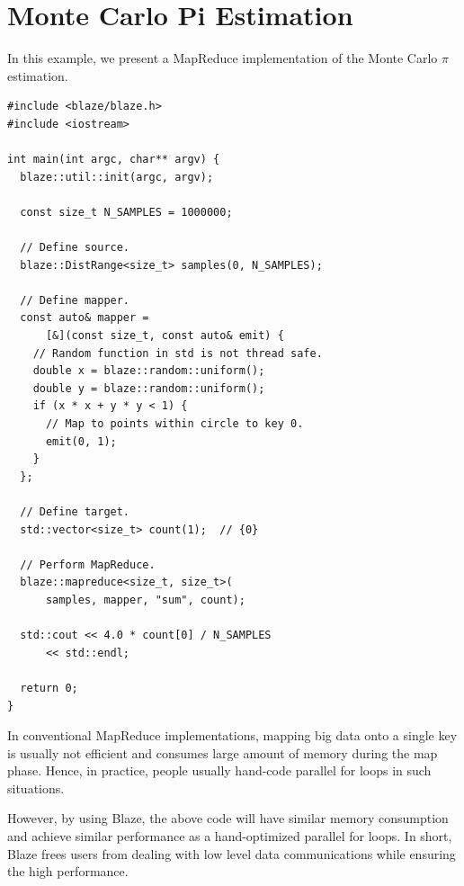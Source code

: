 \documentclass{sigkddExp}
\begin{document}
\section{Monte Carlo Pi Estimation}

In this example, we present a MapReduce implementation of the Monte Carlo $\pi$ estimation.

\begin{lstlisting}
#include <blaze/blaze.h>
#include <iostream>

int main(int argc, char** argv) {
  blaze::util::init(argc, argv);
  
  const size_t N_SAMPLES = 1000000;

  // Define source.
  blaze::DistRange<size_t> samples(0, N_SAMPLES);

  // Define mapper.
  const auto& mapper = 
      [&](const size_t, const auto& emit) {
    // Random function in std is not thread safe.
    double x = blaze::random::uniform();
    double y = blaze::random::uniform();
    if (x * x + y * y < 1) {
      // Map to points within circle to key 0.
      emit(0, 1);
    }
  };

  // Define target.
  std::vector<size_t> count(1);  // {0}

  // Perform MapReduce.
  blaze::mapreduce<size_t, size_t>(
      samples, mapper, "sum", count);

  std::cout << 4.0 * count[0] / N_SAMPLES
      << std::endl;
  
  return 0;
}
\end{lstlisting}

In conventional MapReduce implementations, mapping big data onto a single key is usually not efficient and consumes large amount of memory during the map phase.
Hence, in practice, people usually hand-code parallel for loops in such situations.

However, by using Blaze, the above code will have similar memory consumption and achieve similar performance as a hand-optimized parallel for loops.
In short, Blaze frees users from dealing with low level data communications while ensuring the high performance.

\end{document}
